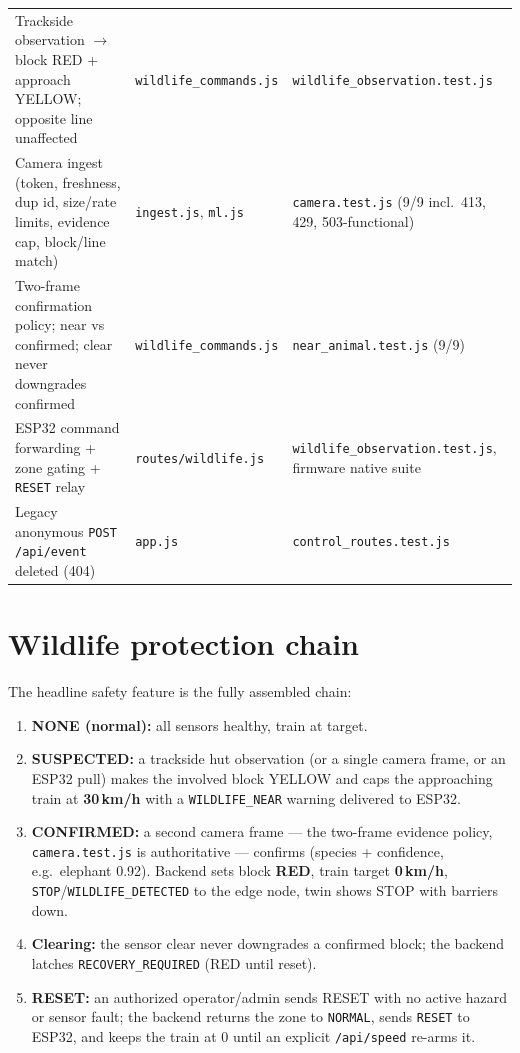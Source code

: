 \begin{longtable}{>{\raggedright}p{5.0cm} >{\raggedright\arraybackslash}p{5.6cm} >{\raggedright\arraybackslash}p{4.6cm}}
Trackside observation $\rightarrow$ block RED + approach YELLOW; opposite line unaffected & \texttt{wildlife\_commands.js} & \texttt{wildlife\_observation.test.js} \\
Camera ingest (token, freshness, dup id, size/rate limits, evidence cap, block/line match) & \texttt{ingest.js}, \texttt{ml.js} & \texttt{camera.test.js} (9/9 incl.\ 413, 429, 503-functional) \\
Two-frame confirmation policy; near vs confirmed; clear never downgrades confirmed & \texttt{wildlife\_commands.js} & \texttt{near\_animal.test.js} (9/9) \\
ESP32 command forwarding + zone gating + \texttt{RESET} relay & \texttt{routes/wildlife.js} & \texttt{wildlife\_observation.test.js}, firmware native suite \\
Legacy anonymous \texttt{POST /api/event} deleted (404) & \texttt{app.js} & \texttt{control\_routes.test.js} \\
\bottomrule
\end{longtable}

\section{Wildlife protection chain}\label{sec:features-wildlife}

The headline safety feature is the fully assembled chain:

\begin{enumerate}
  \item \textbf{NONE (normal):} all sensors healthy, train at target.
  \item \textbf{SUSPECTED:} a trackside hut observation (or a single camera
        frame, or an ESP32 pull) makes the involved block YELLOW and caps
        the approaching train at \textbf{30\,km/h} with a
        \texttt{WILDLIFE\_NEAR} warning delivered to ESP32.
  \item \textbf{CONFIRMED:} a second camera frame --- the two-frame
        evidence policy, \texttt{camera.test.js} is authoritative ---
        confirms (species + confidence, e.g.\ elephant 0.92). Backend
        sets block \textbf{RED}, train target \textbf{0\,km/h},
        \texttt{STOP}/\texttt{WILDLIFE\_DETECTED} to the edge node, twin
        shows STOP with barriers down.
  \item \textbf{Clearing:} the sensor clear never downgrades a confirmed
        block; the backend latches \texttt{RECOVERY\_REQUIRED} (RED until
        reset).
  \item \textbf{RESET:} an authorized operator/admin sends RESET with no
        active hazard or sensor fault; the backend returns the zone to
        \texttt{NORMAL}, sends \texttt{RESET} to ESP32, and keeps the
        train at 0 until an explicit \texttt{/api/speed} re-arms it.
\end{enumerate}

